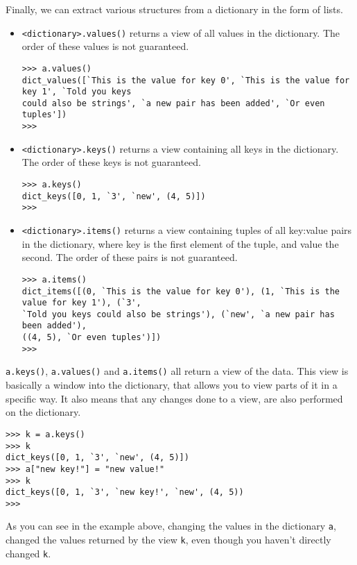 Finally, we can extract various structures from a dictionary in the   form of lists.
\lstset{keywordstyle=\ttfamily}
\begin{itemize}
	\item 
\texttt{<dictionary>.values()} returns a view of      all values in the dictionary. The order of these     values is not guaranteed.      
\begin{lstlisting}
>>> a.values()
dict_values([`This is the value for key 0', `This is the value for key 1', `Told you keys
could also be strings', `a new pair has been added', `Or even tuples'])
>>>
\end{lstlisting}
	\item 
\texttt{<dictionary>.keys()} returns a view     containing all keys in the dictionary. The order of these keys     is not guaranteed.      
\begin{lstlisting}
>>> a.keys()
dict_keys([0, 1, `3', `new', (4, 5)])
>>>
\end{lstlisting}
	\item 
\texttt{<dictionary>.items()} returns a view     containing tuples of all key:value pairs in the dictionary,     where key is the first element of the tuple, and value the     second. The order of these pairs is not guaranteed.      
\begin{lstlisting}
>>> a.items()
dict_items([(0, `This is the value for key 0'), (1, `This is the value for key 1'), (`3',
`Told you keys could also be strings'), (`new', `a new pair has been added'),
((4, 5), `Or even tuples')])
>>>
\end{lstlisting}
\end{itemize}
\lstset{keywordstyle=\textbf}

\texttt{a.keys()}, \texttt{a.values()} and \texttt{a.items()} all return a view of the data. This view is basically a window into the dictionary, that allows you to view parts of it in a specific way. It also means that any changes done to a view, are also performed on the dictionary.
\begin{lstlisting}       
>>> k = a.keys()       
>>> k       
dict_keys([0, 1, `3', `new', (4, 5)])       
>>> a["new key!"] = "new value!"       
>>> k       
dict_keys([0, 1, `3', `new key!', `new', (4, 5))  
>>>   
\end{lstlisting}

As you can see in the example above, changing the values in the dictionary \texttt{a}, changed the values returned by the view \texttt{k}, even though you haven't directly changed \texttt{k}. 

